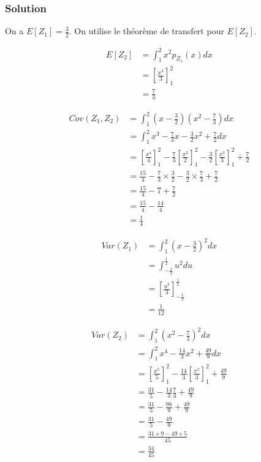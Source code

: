 \documentclass[
10pt, %
a4paper, %
oneside, %
headinclude,footinclude, %
BCOR5mm, %
]{scrartcl}
\begin{document}
\subsubsection{Solution}


On a $E[Z_1] = \frac{3}{2} $. On utilise le théorème de transfert pour $E[Z_2]$.

\begin{equation}
    \begin{aligned}
        \label{eq:}
	E[Z_2] &= \int^{2}_{1} x^2 p_{Z_1}(x)dx \\
	&= [\frac{x^3}{3} ]^2_1\\
	&= \frac{7}{3} 
    \end{aligned}
\end{equation}

\begin{equation}
    \begin{aligned}
        \label{eq:}
	Cov(Z_1, Z_2) &= \int^{2}_{1} (x- \frac{3}{2} )(x^2- \frac{7}{3} )  dx \\
	&= \int^{2}_{1} x^3- \frac{7}{3} x - \frac{3}{2} x^2  + \frac{7}{2}  dx\\
	&= [ \frac{x^4}{4} ]^2_1 - \frac{7}{3} [ \frac{x^2}{2} ]^2_1 - \frac{3}{2} [ \frac{x^3}{3} ]^2_1 + \frac{7}{2} \\
	&= \frac{15}{4} - \frac{7}{3}\times \frac{3}{2} - \frac{3}{2} \times\frac{7}{3} + \frac{7}{2} \\
	&= \frac{15}{4} - 7 + \frac{7}{2} \\
	&= \frac{15}{4} - \frac{14}{4} \\
	&= \frac{1}{4} 
    \end{aligned}
\end{equation}

\begin{equation}
    \begin{aligned}
        \label{eq:}
	Var(Z_1) &= \int^{2}_{1} (x- \frac{3}{2} )^2  dx \\
	&= \int^{ \frac{1}{2} }_{ -\frac{1}{2} } u^2du\\
	&= [ \frac{u^3}{3} ]^{ \frac{1}{2} }_{- \frac{1}{2}} \\
	&= \frac{1}{12} 
    \end{aligned}
\end{equation}

\begin{equation}
    \begin{aligned}
        \label{eq:}
	Var(Z_2) &= \int^{2}_{1} ( x^2 - \frac{7}{3} )^2  dx \\
	&= \int^{2}_{1} x^4- \frac{14}{3} x^2+ \frac{49}{9}  dx \\
	&= [ \frac{x^5}{5} ]^2_1 - \frac{14}{3} [ \frac{x^3}{3} ]^2_1 + \frac{49}{9} \\
	&= \frac{31}{5} - \frac{14}{3} \frac{7}{3} + \frac{49}{9} \\
	&= \frac{31}{5} - \frac{98}{9} + \frac{49}{9} \\
	&= \frac{31}{5} - \frac{49}{9} \\
	&= \frac{31\times 9 - 49\times 5}{45} \\
	&= \frac{34}{45} 
    \end{aligned}
\end{equation}
\end{document}
